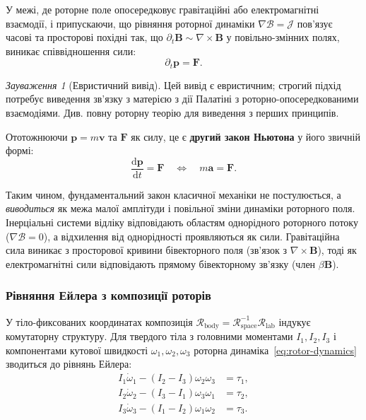 \documentclass[11pt,a4paper]{article}
\newcommand{\Rotor}{\mathcal{R}}
\newcommand{\Biv}{\mathcal{B}}
\newcommand{\D}{\nabla}                        %
\theoremstyle{definition}
\theoremstyle{plain}
\theoremstyle{remark}
\newtheorem{remark}{Зауваження}
\begin{document}
У межі, де роторне поле опосередковує гравітаційні або електромагнітні взаємодії, і припускаючи, що рівняння роторної динаміки $\D\Biv = \mathcal{J}$ пов'язує часові та просторові похідні так, що $\partial_t \mathbf{B} \sim \nabla \times \mathbf{B}$ у повільно-змінних полях, виникає співвідношення сили:
\begin{equation}
\partial_t \mathbf{p} = \mathbf{F}.
\label{eq:newton-translational}
\end{equation}

\begin{remark}[Евристичний вивід]
Цей вивід є евристичним; строгий підхід потребує виведення зв'язку з матерією з дії Палатіні з роторно-опосередкованими взаємодіями. Див. повну роторну теорію для виведення з перших принципів.
\end{remark}

Ототожнюючи $\mathbf{p} = m\mathbf{v}$ та $\mathbf{F}$ як силу, це є \textbf{другий закон Ньютона} у його звичній формі:
\begin{equation}
\boxed{\frac{\mathrm{d}\mathbf{p}}{\mathrm{d}t} = \mathbf{F} \quad \Longleftrightarrow \quad m\mathbf{a} = \mathbf{F}.}
\label{eq:newton-final}
\end{equation}

Таким чином, фундаментальний закон класичної механіки не постулюється, а \emph{виводиться} як межа малої амплітуди і повільної зміни динаміки роторного поля. Інерціальні системи відліку відповідають областям однорідного роторного потоку ($\D\Biv = 0$), а відхилення від однорідності проявляються як сили. Гравітаційна сила виникає з просторової кривини бівекторного поля (зв'язок з $\nabla \times \mathbf{B}$), тоді як електромагнітні сили відповідають прямому бівекторному зв'язку (член $\beta\mathbf{B}$).

\subsubsection{Рівняння Ейлера з композиції роторів}

У тіло-фиксованих координатах композиція $\Rotor_{\text{body}} = \Rotor_{\text{space}}^{-1} \Rotor_{\text{lab}}$ індукує комутаторну структуру. Для твердого тіла з головними моментами $I_1, I_2, I_3$ і компонентами кутової швидкості $\omega_1, \omega_2, \omega_3$ роторна динаміка~\eqref{eq:rotor-dynamics} зводиться до рівнянь Ейлера:
\begin{align}
I_1 \dot{\omega}_1 - (I_2 - I_3)\omega_2\omega_3 &= \tau_1, \\
I_2 \dot{\omega}_2 - (I_3 - I_1)\omega_3\omega_1 &= \tau_2, \\
I_3 \dot{\omega}_3 - (I_1 - I_2)\omega_1\omega_2 &= \tau_3.
\end{align}
\end{document}
